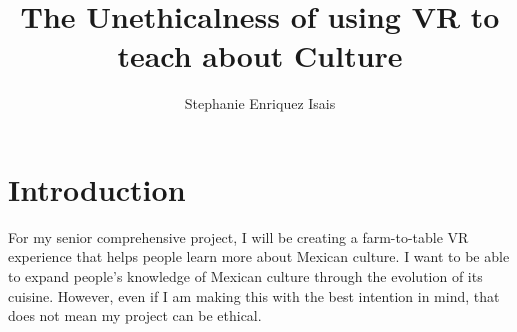 \documentclass[11pt,twocolumn]{article}
\title{The Unethicalness of using VR to teach about Culture}
\author{Stephanie Enriquez Isais}
\affiliation{Occidental College}
\begin{document}
\maketitle


\section{Introduction}
For my senior comprehensive project, I will be creating a farm-to-table VR experience that helps people learn more about Mexican culture. I want to be able to expand people's knowledge of Mexican culture through the evolution of its cuisine. However, even if I am making this with the best intention in mind, that does not mean my project can be ethical. 
\end{document}
